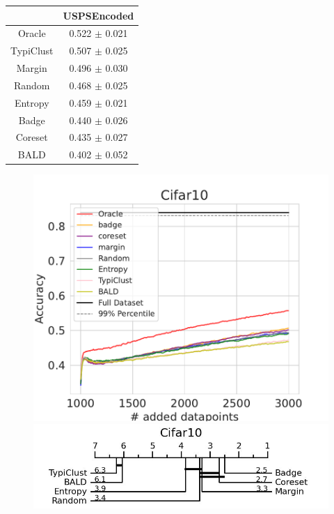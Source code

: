 \documentclass[]{article}
\begin{document}
\begin{minipage}{0.29\linewidth}
\begin{tabular}{c|c}
&USPSEncoded\\
\hline
Oracle&0.522 $\pm$ 0.021\\
TypiClust&0.507 $\pm$ 0.025\\
Margin&0.496 $\pm$ 0.030\\
Random&0.468 $\pm$ 0.025\\
Entropy&0.459 $\pm$ 0.021\\
Badge&0.440 $\pm$ 0.026\\
Coreset&0.435 $\pm$ 0.027\\
BALD&0.402 $\pm$ 0.052\\
\end{tabular}
\end{minipage}
\begin{minipage}{0.65\linewidth}
\begin{figure}[H]
    \centering
    \includegraphics[width=\linewidth]{img/eval_cifar10}\\ [2mm]
    \includegraphics[width=\linewidth]{img/micro_cifar10.jpg}
\end{figure}
\end{minipage}
\end{document}
